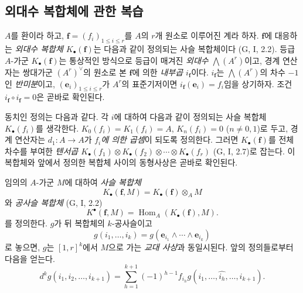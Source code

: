 \subsection{외대수 복합체에 관한 복습}
\label{subsection:III.1.1-fr}

\begin{env}[1.1.1]
\label{III.1.1.1-fr}
$A$를 환이라 하고, $\mathbf f=(f_i)_{1\leq i\leq r}$를 $A$의 $r$개
원소로 이루어진 계라 하자. $\mathbf f$에 대응하는 \emph{외대수 복합체
$K_\bullet(\mathbf f)$}는 다음과 같이 정의되는 사슬 복합체이다
(G, I, 2.2). 등급 $A$-가군 $K_\bullet(\mathbf f)$는 통상적인 방식으로
등급이 매겨진 \emph{외대수 $\bigwedge(A^r)$}이고, 경계 연산자는
쌍대가군 $(A^r)^\vee$의 원소로 본 $\mathbf f$에 의한 \emph{내부곱
$i_{\mathbf f}$}이다. $i_{\mathbf f}$는 $\bigwedge(A^r)$의 차수 $-1$인
\emph{반미분}이고, $(\mathbf e_i)_{1\leq i\leq r}$가 $A^r$의 표준기저이면
$i_{\mathbf f}(\mathbf e_i)=f_i$임을 상기하자. 조건
$i_{\mathbf f}\circ i_{\mathbf f}=0$은 곧바로 확인된다.

동치인 정의는 다음과 같다. 각 $i$에 대하여 다음과 같이 정의되는 사슬
복합체 $K_\bullet(f_i)$를 생각한다.
$K_0(f_i)=K_1(f_i)=A$, $K_n(f_i)=0$ ($n\neq0,1$)로 두고, 경계 연산자는
$d_1:A\to A$가 \emph{$f_i$에 의한 곱셈}이 되도록 정의한다. 그러면
$K_\bullet(\mathbf f)$를 전체 차수를 부여한 \emph{텐서곱
$K_\bullet(f_1)\otimes K_\bullet(f_2)\otimes\cdots\otimes K_\bullet(f_r)$}
(G, I, 2.7)로 잡는다. 이 복합체와 앞에서 정의한 복합체 사이의 동형사상은
곧바로 확인된다.
\end{env}

\begin{env}[1.1.2]
\label{III.1.1.2-fr}
임의의 $A$-가군 $M$에 대하여 \emph{사슬 복합체}
\begin{equation}
\label{III.1.1.2.1-fr}
\tag{1.1.2.1}
K_\bullet(\mathbf f,M)=K_\bullet(\mathbf f)\otimes_A M
\end{equation}
와 \emph{공사슬 복합체} (G, I, 2.2)
\begin{equation}
\label{III.1.1.2.2-fr}
\tag{1.1.2.2}
K^\bullet(\mathbf f,M)=\operatorname{Hom}_A(K_\bullet(\mathbf f),M).
\end{equation}
를 정의한다. $g$가 뒤 복합체의 $k$-공사슬이고
\[
g(i_1,\ldots,i_k)=g(\mathbf e_{i_1}\wedge\cdots\wedge\mathbf e_{i_k})
\]
로 놓으면, $g$는 $[1,r]^k$에서 $M$으로 가는 \emph{교대 사상}과 동일시된다.
앞의 정의들로부터 다음을 얻는다.
\begin{equation}
\label{III.1.1.2.3-fr}
\tag{1.1.2.3}
d^kg(i_1,i_2,\ldots,i_{k+1})=
\sum_{h=1}^{k+1}(-1)^{h-1}f_{i_h}
g(i_1,\ldots,\widehat{i_h},\ldots,i_{k+1}).
\end{equation}
\end{env}

